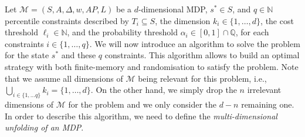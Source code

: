 Let $\mathcal{M}=(S, A, \Delta, w, AP, L)$ be a $d$-dimensional MDP,
$s^* \in S$, and $q \in \mathbb{N}$ percentile constraints described by
$T_i \subseteq S$, the dimension $k_i \in \{1, \dots, d\}$, the cost threshold $\ell_i \in \mathbb{N}$, and the probability threshold $\alpha_i \in [0, 1] \cap \mathbb{Q}$, for each constraints $i \in \{1, \dots, q\}$.
We will now introduce an algorithm to solve the \SSPPQ{} problem for the state $s^*$ and these $q$ constraints. This algorithm allows to build an optimal strategy with both finite-memory and randomisation to satisfy the problem.
Note that we assume all dimensions of $\mathcal{M}$ being relevant for this problem, i.e., $\bigcup_{i \in \{1, \dots q\}} k_i = \{1, \dots, d\}$.
On the other hand, we simply drop the $n$ irrelevant dimensions of $\mathcal{M}$ for the problem and we only consider the $d-n$ remaining one.
In order to describe this algorithm, we need to define the \textit{multi-dimensional unfolding of an MDP}.

